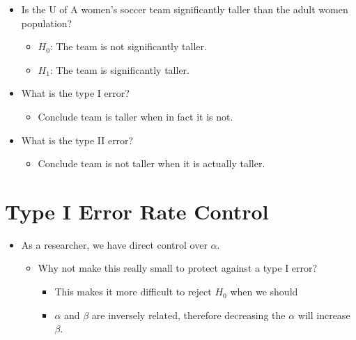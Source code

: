 \documentclass[12pt]{article}
\begin{document}
\begin{itemize}
\itemsep1pt\parskip0pt
\item
  Is the U of A women's soccer team significantly taller than the adult
  women population?

  \begin{itemize}
  \itemsep1pt\parskip0pt
  \item
    \(H_{0}\): The team is not significantly taller.
  \item
    \(H_{1}\): The team is significantly taller.
  \end{itemize}
\item
  What is the type I error?

  \begin{itemize}
  \itemsep1pt\parskip0pt
  \item
    Conclude team is taller when in fact it is not.
  \end{itemize}
\item
  What is the type II error?

  \begin{itemize}
  \itemsep1pt\parskip0pt
  \item
    Conclude team is not taller when it is actually taller.
  \end{itemize}
\end{itemize}

\section{Type I Error Rate Control}\label{type-i-error-rate-control}

\begin{itemize}
\itemsep1pt\parskip0pt
\item
  As a researcher, we have direct control over \(\alpha\).

  \begin{itemize}
  \itemsep1pt\parskip0pt
  \item
    Why not make this really small to protect against a type I error?

    \begin{itemize}
    \itemsep1pt\parskip0pt
    \item
      This makes it more difficult to reject \(H_{0}\) when we should
    \item
      \(\alpha\) and \(\beta\) are inversely related, therefore
      decreasing the \(\alpha\) will increase \(\beta\).
    \end{itemize}
  \end{itemize}
\end{itemize}
\end{document}
